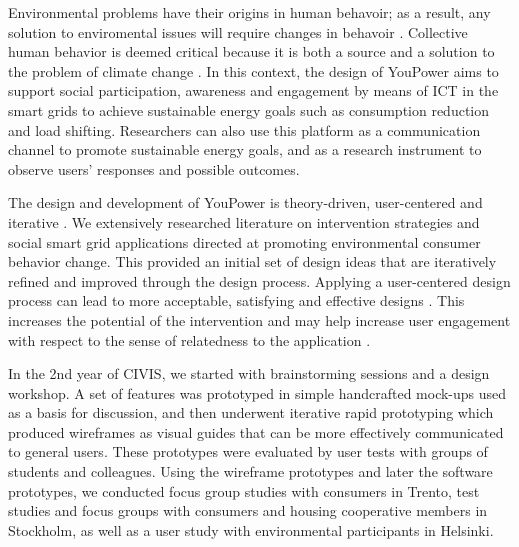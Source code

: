 Environmental problems have their origins in human behavoir; as a result, any solution to enviromental issues will require changes in behavoir 
\citep{Schultz2014}.
Collective human behavior is deemed critical because it is both a source and a solution to the problem of climate change \citep{Masson2014}.
In this context, the design of YouPower aims to support social participation, awareness and engagement by means of ICT in the smart grids to achieve sustainable energy goals such as consumption reduction and load shifting. Researchers can also use this platform as a communication channel to promote sustainable energy goals, and as a research instrument to observe users' responses and possible outcomes. 



The design and development of YouPower is theory-driven, user-centered and iterative \citep{Leffingwell2000,Leffingwell2011}. We extensively researched literature on intervention strategies and social smart grid applications directed at promoting environmental consumer behavior change. This provided an initial set of design ideas that are iteratively refined and improved through the design process. Applying a user-centered design process can lead to more acceptable, satisfying and effective designs \citep{Brynjarsdottir2012}. This increases the potential of the intervention \citep{dick2012empowering} and may help increase user engagement with respect to the sense of relatedness to the application \citep{pierce2003state,schwartz2015people,edward2015review}. 

In the 2nd year of CIVIS, we started with brainstorming sessions and a design workshop. A set of features was prototyped in simple handcrafted mock-ups used as a basis for discussion, and then underwent iterative rapid prototyping which produced wireframes as visual guides that can be more effectively communicated to general users. These prototypes were evaluated by user tests with groups of students and colleagues. Using the wireframe prototypes and later the software prototypes, we conducted focus group studies with consumers in Trento, test studies and focus groups with consumers and housing cooperative members in Stockholm, as well as a user study with environmental participants in Helsinki. 

